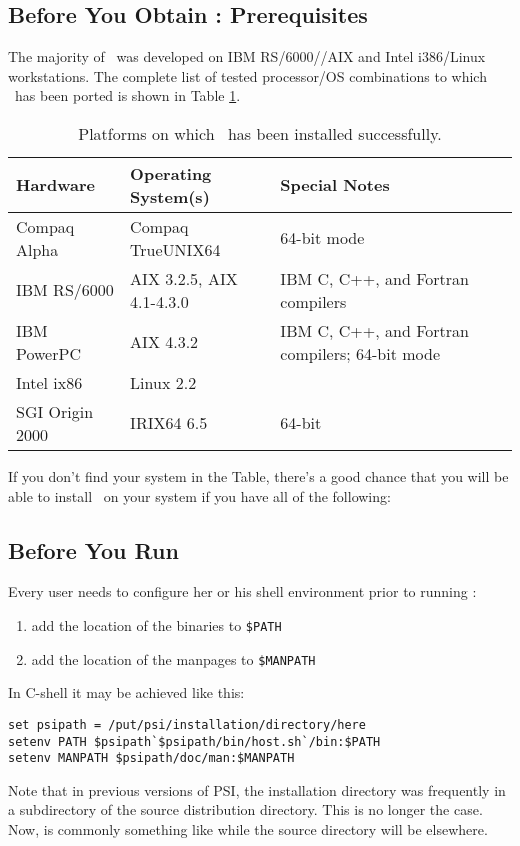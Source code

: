 \subsection{Before You Obtain \PSIthree: Prerequisites}
The majority of \PSIthree\ was developed on IBM RS/6000//AIX
and Intel i386/Linux workstations. The complete list of
tested processor/OS combinations to which \PSIthree\ has
been ported is shown in Table \ref{table:ports}.
\begin{table}
\caption{Platforms on which \PSIthree\ has been installed successfully.} \label{table:ports}
\begin{tabular}{lll} \hline\hline
Hardware & Operating System(s) & Special Notes \\ \hline
Compaq Alpha & Compaq TrueUNIX64 & 64-bit mode \\
IBM RS/6000 & AIX 3.2.5, AIX 4.1-4.3.0 &
IBM C, C++, and Fortran compilers\\
IBM PowerPC & AIX 4.3.2 & 
IBM C, C++, and Fortran compilers;
64-bit mode\\
Intel ix86 & Linux 2.2 & \\
SGI Origin 2000 & IRIX64 6.5 & 64-bit \\ \hline\hline
\end{tabular}
\end{table}
If you don't find your system in the Table, there's a good chance
that you will be able to install \PSIthree\ on your system
if you have all of the following:

\subsection{Before You Run \PSIthree}
Every user needs to configure her or his
shell environment prior to running \PSIthree:
\begin{enumerate}
\item add the location of the binaries to {\tt \$PATH}
\item add the location of the manpages to {\tt \$MANPATH}
\end{enumerate}
In C-shell it may be achieved like this:
\begin{verbatim}
set psipath = /put/psi/installation/directory/here
setenv PATH $psipath`$psipath/bin/host.sh`/bin:$PATH
setenv MANPATH $psipath/doc/man:$MANPATH
\end{verbatim}
Note that in previous versions of PSI, the installation directory
was frequently in a subdirectory of the source distribution directory.
This is no longer the case.  Now,  is commonly something
like  while the source directory will be elsewhere.

